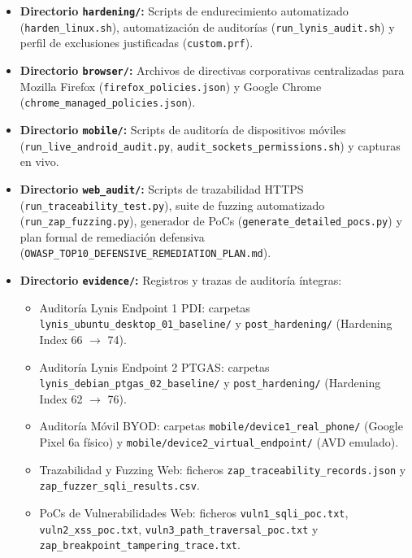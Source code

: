 \documentclass[11pt,a4paper]{article}
\begin{document}
\begin{itemize}[noitemsep]
    \item \textbf{Directorio \texttt{hardening/}:} Scripts de endurecimiento automatizado (\texttt{harden\_linux.sh}), automatización de auditorías (\texttt{run\_lynis\_audit.sh}) y perfil de exclusiones justificadas (\texttt{custom.prf}).
    \item \textbf{Directorio \texttt{browser/}:} Archivos de directivas corporativas centralizadas para Mozilla Firefox (\texttt{firefox\_policies.json}) y Google Chrome (\texttt{chrome\_managed\_policies.json}).
    \item \textbf{Directorio \texttt{mobile/}:} Scripts de auditoría de dispositivos móviles (\texttt{run\_live\_android\_audit.py}, \texttt{audit\_sockets\_permissions.sh}) y capturas en vivo.
    \item \textbf{Directorio \texttt{web\_audit/}:} Scripts de trazabilidad HTTPS (\texttt{run\_traceability\_test.py}), suite de fuzzing automatizado (\texttt{run\_zap\_fuzzing.py}), generador de PoCs (\texttt{generate\_detailed\_pocs.py}) y plan formal de remediación defensiva (\texttt{OWASP\_TOP10\_DEFENSIVE\_REMEDIATION\_PLAN.md}).
    \item \textbf{Directorio \texttt{evidence/}:} Registros y trazas de auditoría íntegras:
        \begin{itemize}[noitemsep]
            \item Auditoría Lynis Endpoint 1 PDI: carpetas \texttt{lynis\_ubuntu\_desktop\_01\_baseline/} y \texttt{post\_hardening/} (Hardening Index 66 $\rightarrow$ 74).
            \item Auditoría Lynis Endpoint 2 PTGAS: carpetas \texttt{lynis\_debian\_ptgas\_02\_baseline/} y \texttt{post\_hardening/} (Hardening Index 62 $\rightarrow$ 76).
            \item Auditoría Móvil BYOD: carpetas \texttt{mobile/device1\_real\_phone/} (Google Pixel 6a físico) y \texttt{mobile/device2\_virtual\_endpoint/} (AVD emulado).
            \item Trazabilidad y Fuzzing Web: ficheros \texttt{zap\_traceability\_records.json} y \texttt{zap\_fuzzer\_sqli\_results.csv}.
            \item PoCs de Vulnerabilidades Web: ficheros \texttt{vuln1\_sqli\_poc.txt}, \texttt{vuln2\_xss\_poc.txt}, \texttt{vuln3\_path\_traversal\_poc.txt} y \texttt{zap\_breakpoint\_tampering\_trace.txt}.
        \end{itemize}
\end{itemize}
\end{document}
